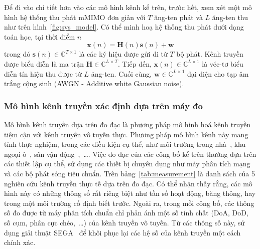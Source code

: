 Để đi vào chi tiết hơn vào các mô hình kênh kể trên, trước hết, xem xét một mô hình hệ thống thu phát mMIMO đơn giản với $T$ ăng-ten phát và $L$ ăng-ten thu như trên hình~\ref{fig:sys_model}. Có thể minh hoạ hệ thống thu phát dưới dạng toán học, tại thời điểm $n$
\begin{equation}
    \mathbf{x}(n) = \mathbf{H}(n)\mathbf{s}(n) + \mathbf{w}
\end{equation}
trong đó $\mathbf{s}(n) \in \mathbb{C}^{T \times 1}$ là các ký hiệu được gửi đi từ $T$ bộ phát. Kênh truyền được biểu diễn là ma trận $\mathbf{H} \in \mathbb{C}^{L\times T}$. Tiếp đến, $\mathbf{x}(n) \in \mathbb{C}^{L \times 1}$ là véc-tơ biểu diễn tín hiệu thu được từ $L$ ăng-ten. Cuối cùng, $\mathbf{w} \in \mathbb{C}^{L \times 1}$ đại diện cho tạp âm trắng cộng sinh (AWGN - Additive white Gaussian noise). 

\subsubsection{Mô hình kênh truyền xác định dựa trên máy đo}

Mô hình kênh truyền dựa trên đo đạc là phương pháp mô hình hoá kênh truyền tiệm cận với kênh truyền vô tuyến thực. Phương pháp mô hình kênh này mang tính thực nghiệm, trong các điều kiện cụ thể, như môi trường trong nhà~\cite{Li2018, Willhammar2020}, khu ngoại ô~\cite{Hao2019}, sân vận động~\cite{Liu2015},~\ldots. Việc đo đạc của các công bố kể trên thường dựa trên các thiết lập cụ thể, sử dụng các thiết bị chuyên dụng như máy phân tích mạng và các bộ phát sóng tiêu chuẩn. Trên bảng~\ref{tab:measurement} là danh sách của 5 nghiên cứu kênh truyền thực tế dựa trên đo đạc. Có thể nhận thấy rằng, các mô hình này có những thông số rất riêng biệt như tần số hoạt động, băng thông, hay trong một môi trường cố định biết trước. Ngoài ra, trong mỗi công bố, các thông số đo được từ máy phân tích chuẩn chỉ phản ánh một số tính chất (DoA, DoD, số cụm, phân cực chéo,~\ldots) của kênh truyền vô tuyến. Từ các thông số này, sử dụng giải thuật SEGA~\cite{Fleury1999} để khôi phục lại các hệ số của kênh truyền một cách chính xác.

